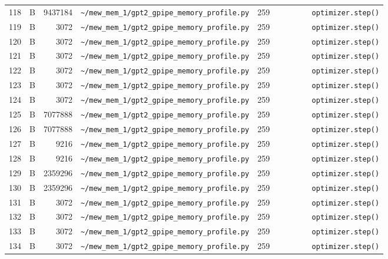 \documentclass{article}
\begin{document}
\begin{longtable}{r l r p{6.5cm} r p{7.0cm}}
118 & B & 9437184 & \lstinline|~/mew_mem_1/gpt2_gpipe_memory_profile.py| & 259 & \lstinline|        optimizer.step()| \\
119 & B & 3072 & \lstinline|~/mew_mem_1/gpt2_gpipe_memory_profile.py| & 259 & \lstinline|        optimizer.step()| \\
120 & B & 3072 & \lstinline|~/mew_mem_1/gpt2_gpipe_memory_profile.py| & 259 & \lstinline|        optimizer.step()| \\
121 & B & 3072 & \lstinline|~/mew_mem_1/gpt2_gpipe_memory_profile.py| & 259 & \lstinline|        optimizer.step()| \\
122 & B & 3072 & \lstinline|~/mew_mem_1/gpt2_gpipe_memory_profile.py| & 259 & \lstinline|        optimizer.step()| \\
123 & B & 3072 & \lstinline|~/mew_mem_1/gpt2_gpipe_memory_profile.py| & 259 & \lstinline|        optimizer.step()| \\
124 & B & 3072 & \lstinline|~/mew_mem_1/gpt2_gpipe_memory_profile.py| & 259 & \lstinline|        optimizer.step()| \\
125 & B & 7077888 & \lstinline|~/mew_mem_1/gpt2_gpipe_memory_profile.py| & 259 & \lstinline|        optimizer.step()| \\
126 & B & 7077888 & \lstinline|~/mew_mem_1/gpt2_gpipe_memory_profile.py| & 259 & \lstinline|        optimizer.step()| \\
127 & B & 9216 & \lstinline|~/mew_mem_1/gpt2_gpipe_memory_profile.py| & 259 & \lstinline|        optimizer.step()| \\
128 & B & 9216 & \lstinline|~/mew_mem_1/gpt2_gpipe_memory_profile.py| & 259 & \lstinline|        optimizer.step()| \\
129 & B & 2359296 & \lstinline|~/mew_mem_1/gpt2_gpipe_memory_profile.py| & 259 & \lstinline|        optimizer.step()| \\
130 & B & 2359296 & \lstinline|~/mew_mem_1/gpt2_gpipe_memory_profile.py| & 259 & \lstinline|        optimizer.step()| \\
131 & B & 3072 & \lstinline|~/mew_mem_1/gpt2_gpipe_memory_profile.py| & 259 & \lstinline|        optimizer.step()| \\
132 & B & 3072 & \lstinline|~/mew_mem_1/gpt2_gpipe_memory_profile.py| & 259 & \lstinline|        optimizer.step()| \\
133 & B & 3072 & \lstinline|~/mew_mem_1/gpt2_gpipe_memory_profile.py| & 259 & \lstinline|        optimizer.step()| \\
134 & B & 3072 & \lstinline|~/mew_mem_1/gpt2_gpipe_memory_profile.py| & 259 & \lstinline|        optimizer.step()| \\

\end{longtable}
\end{document}
